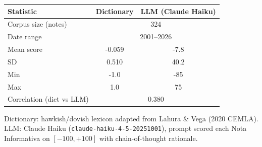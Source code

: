 
\begin{tabular}{lcc}
\toprule
Statistic & Dictionary & LLM (Claude Haiku) \\
\midrule
    Corpus size (notes) & \multicolumn{2}{c}{324} \\
    Date range & \multicolumn{2}{c}{2001--2026} \\
    Mean score & -0.059 & -7.8 \\
    SD & 0.510 & 40.2 \\
    Min & -1.0 & -85 \\
    Max & 1.0 & 75 \\
    Correlation (dict vs LLM) & \multicolumn{2}{c}{0.380} \\
\bottomrule
\end{tabular}
\begin{tablenotes}
\small Dictionary: hawkish/dovish lexicon adapted from Lahura \& Vega (2020 CEMLA).
LLM: Claude Haiku (\texttt{claude-haiku-4-5-20251001}), prompt scored each
Nota Informativa on $[-100, +100]$ with chain-of-thought rationale.
\end{tablenotes}
